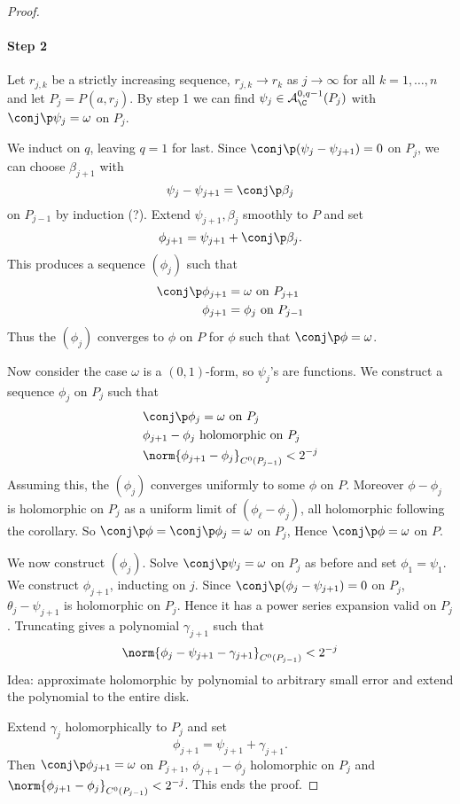 \documentclass[a4paper]{article}
\begin{document}
\begin{proof}
  \paragraph{Step 2}
  Let \(r_{j, k}\) be a strictly increasing sequence, \(r_{j, k} \to r_k\) as \(j \to \infty\) for all \(k = 1, \dots, n\) and let \(P_j = P(a, r_j)\). By step 1 we can find \(\psi_j \in \mathcal A_\C^{0, q - 1}(P_j)\) with \(\conj \p \psi_j = \omega\) on \(P_j\).

  We induct on \(q\), leaving \(q = 1\) for last. Since \(\conj \p(\psi_j - \psi_{j + 1}) = 0\) on \(P_j\), we can choose \(\beta_{j + 1}\) with
  \[
    \psi_j - \psi_{j + 1} = \conj \p \beta_j
  \]
  on \(P_{j - 1}\) by induction (?). Extend \(\psi_{j + 1}, \beta_j\) smoothly to \(P\) and set
  \[
    \phi_{j + 1} = \psi_{j + 1} + \conj \p \beta_j.
  \]
  This produces a sequence \((\phi_j)\) such that
  \begin{align*}
    \conj \p \phi_{j + 1} &= \omega \text{ on } P_{j + 1} \\
    \phi_{j + 1} &= \phi_j \text{ on } P_{j - 1}
  \end{align*}
  Thus the \((\phi_j)\) converges to \(\phi\) on \(P\) for \(\phi\) such that \(\conj \p \phi = \omega\).

  Now consider the case \(\omega\) is a \((0, 1)\)-form, so \(\psi_j\)'s are functions. We construct a sequence \(\phi_j\) on \(P_j\) such that
  \begin{align*}
    &\conj \p \phi_j = \omega \text{ on } P_j \\
    &\phi_{j + 1} - \phi_j \text{ holomorphic on } P_j \\
    &\norm{\phi_{j + 1} - \phi_j}_{C^0(P_{j - 1})} < 2^{-j}
  \end{align*}
  Assuming this, the \((\phi_j)\) converges uniformly to some \(\phi\) on \(P\). Moreover \(\phi - \phi_j\) is holomorphic on \(P_j\) as a uniform limit of \((\phi_\ell - \phi_j)\), all holomorphic following the corollary. So \(\conj \p \phi = \conj \p \phi_j = \omega\) on \(P_j\), Hence \(\conj \p \phi = \omega\) on \(P\).

  We now construct \((\phi_j)\). Solve \(\conj \p \psi_j = \omega\) on \(P_j\) as before and set \(\phi_1 = \psi_1\). We construct \(\phi_{j + 1}\), inducting on \(j\). Since \(\conj \p(\phi_j - \psi_{j + 1}) = 0\) on \(P_j\), \(\theta_j - \psi_{j + 1}\) is holomorphic on \(P_j\). Hence it has a power series expansion valid on \(P_j\). Truncating gives a polynomial \(\gamma_{j + 1}\) such that
  \[
    \norm{\phi_j - \psi_{j + 1} - \gamma_{j + 1}}_{C^0(P_{j - 1})} < 2^{-j}
  \]
  Idea: approximate holomorphic by polynomial to arbitrary small error and extend the polynomial to the entire disk.

  Extend \(\gamma_j\) holomorphically to \(P_j\) and set
  \[
    \phi_{j + 1} = \psi_{j + 1} + \gamma_{j + 1}.
  \]
  Then \(\conj \p \phi_{j + 1} = \omega\) on \(P_{j + 1}\), \(\phi_{j + 1} - \phi_j\) holomorphic on \(P_j\) and \(\norm{\phi_{j + 1} - \phi_j}_{C^0(P_{j - 1})} < 2^{-j}\). This ends the proof.
\end{proof}
\end{document}
